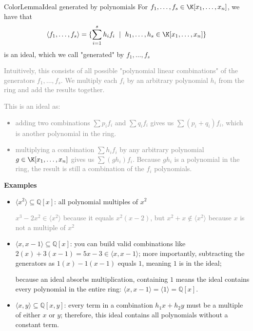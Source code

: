 \documentclass[a4paper, 11pt]{report}
\begin{document}
\begin{cframe}{ColorLemma}{Ideal generated by polynomials}{}
    For $f_{1}, \dots, f_{s} \in \K[x_{1}, \dots, x_{n}]$, we have that
    \large
    $$
    \langle f_{1}, \dots, f_{s} \rangle = \{
        \sum_{i=1}^{s} h_{i} f_{i} \ \mid \ h_{1}, \dots, h_{s} \in\K[x_{1}, \dots, x_{n}]
    \}
    $$
    is an ideal, which we call "generated" by $f_{1}, \dots, f_{s}$

\textcolor{gray}{Intuitively, this consists of all possible "polynomial linear combinations" of the generators $f_1, \dots, f_s$. We multiply each $f_i$ by an arbitrary polynomial $h_i$ from the ring and add the results together.}
\end{cframe}

\textcolor{gray}
{This is an ideal as:
\begin{itemize}
    \item adding two combinations $\sum p_i f_i$ and $\sum q_i f_i$ gives us $\sum (p_i + q_i) f_i$, which is another polynomial in the ring.
    \item multiplying a combination $\sum h_i f_i$ by any arbitrary polynomial $g \in \K[x_1, \dots, x_n]$ gives us $\sum (g h_i) f_i$. Because $g h_i$ is a polynomial in the ring, the result is still a combination of the $f_i$ polynomials.
\end{itemize}}

\textbf{Examples}
\begin{itemize}
    \item $\langle x^2 \rangle \subseteq \mathbb{Q}[x]$: 
        \subitem all polynomial multiples of $x^2$

        \textcolor{gray}{$x^3 - 2x^2 \in \langle x^2 \rangle$ because it equals $x^2(x - 2)$, but $x^2 + x \notin \langle x^2 \rangle$ because $x$ is not a multiple of $x^2$}
    \item $\langle x, x-1 \rangle \subseteq \mathbb{Q}[x]$: 
        \subitem you can build valid combinations like $2(x) + 3(x-1) = 5x - 3 \in \langle x, x-1 \rangle$; more importantly, subtracting the generators as $1(x) - 1(x-1)$ equals $1$, meaning $1$ is in the ideal;

        because an ideal absorbs multiplication, containing $1$ means the ideal contains every polynomial in the entire ring: $\langle x, x-1 \rangle = \langle 1 \rangle = \mathbb{Q}[x]$.
    \item $\langle x, y \rangle \subseteq \mathbb{Q}[x, y]$: 
        \subitem every term in a combination $h_1 x + h_2 y$ must be a multiple of either $x$ or $y$; therefore, this ideal contains all polynomials without a constant term.
\end{itemize}
\end{document}

